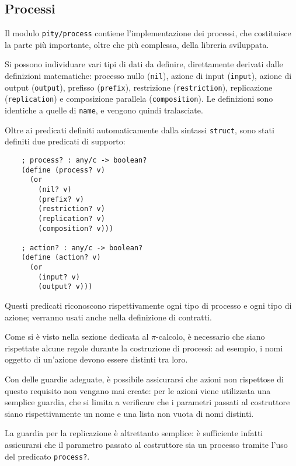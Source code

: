 \subsection{Processi}

Il modulo \lstinline{pity/process} contiene l'implementazione dei processi,
che costituisce la parte pi\`u importante, oltre che pi\`u complessa, della
libreria sviluppata.

Si possono individuare vari tipi di dati da definire, direttamente derivati
dalle definizioni matematiche: processo nullo (\lstinline{nil}), azione di
input (\lstinline{input}), azione di output (\lstinline{output}), prefisso
(\lstinline{prefix}), restrizione (\lstinline{restriction}), replicazione
(\lstinline{replication}) e composizione parallela (\lstinline{composition}).
Le definizioni sono identiche a quelle di \lstinline{name}, e vengono quindi
tralasciate.

Oltre ai predicati definiti automaticamente dalla sintassi
\lstinline{struct}, sono stati definiti due predicati di supporto:

\begin{lstlisting}
    ; process? : any/c -> boolean?
    (define (process? v)
      (or
        (nil? v)
        (prefix? v)
        (restriction? v)
        (replication? v)
        (composition? v)))

    ; action? : any/c -> boolean?
    (define (action? v)
      (or
        (input? v)
        (output? v)))

\end{lstlisting}

Questi predicati riconoscono rispettivamente ogni tipo di processo e ogni
tipo di azione; verranno usati anche nella definizione di contratti.

Come si \`e visto nella sezione dedicata al $\pi$-calcolo, \`e necessario
che siano rispettate alcune regole durante la costruzione di processi: ad
esempio, i nomi oggetto di un'azione devono essere distinti tra loro.

Con delle guardie adeguate, \`e possibile assicurarsi che azioni non
rispettose di questo requisito non vengano mai create: per le azioni viene
utilizzata una semplice guardia, che si limita a verificare che i parametri
passati al costruttore siano rispettivamente un nome e una lista non vuota
di nomi distinti.

La guardia per la replicazione \`e altrettanto semplice: \`e sufficiente
infatti assicurarsi che il parametro passato al costruttore sia un processo
tramite l'uso del predicato \lstinline{process?}.

